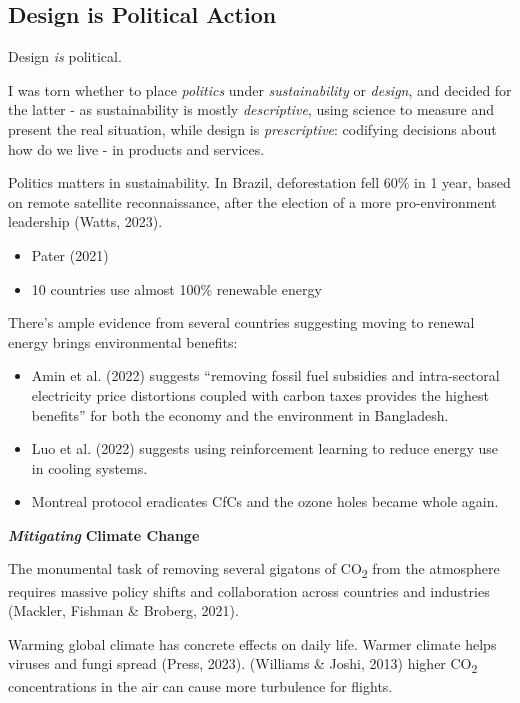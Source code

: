 \documentclass[
  letterpaper,
  DIV=11,
  numbers=noendperiod]{scrartcl}
\providecommand{\tightlist}{%
  \setlength{\itemsep}{0pt}\setlength{\parskip}{0pt}}\usepackage{longtable,booktabs,array}
\begin{document}
\subsection{Design is Political
Action}\label{design-is-political-action}

Design \emph{is} political.

I was torn whether to place \emph{politics} under \emph{sustainability}
or \emph{design}, and decided for the latter - as sustainability is
mostly \emph{descriptive}, using science to measure and present the real
situation, while design is \emph{prescriptive}: codifying decisions
about how do we live - in products and services.

Politics matters in sustainability. In Brazil, deforestation fell 60\%
in 1 year, based on remote satellite reconnaissance, after the election
of a more pro-environment leadership (Watts, 2023).

\begin{itemize}
\tightlist
\item
  Pater (2021)
\item
  10 countries use almost 100\% renewable energy
\end{itemize}

There's ample evidence from several countries suggesting moving to
renewal energy brings environmental benefits:

\begin{itemize}
\item
  Amin et al. (2022) suggests ``removing fossil fuel subsidies and
  intra-sectoral electricity price distortions coupled with carbon taxes
  provides the highest benefits'' for both the economy and the
  environment in Bangladesh.
\item
  Luo et al. (2022) suggests using reinforcement learning to reduce
  energy use in cooling systems.
\item
  Montreal protocol eradicates CfCs and the ozone holes became whole
  again.
\end{itemize}

\textbf{\emph{Mitigating}} \textbf{Climate Change}

The monumental task of removing several gigatons of CO\textsubscript{2}
from the atmosphere requires massive policy shifts and collaboration
across countries and industries (Mackler, Fishman \& Broberg, 2021).

Warming global climate has concrete effects on daily life. Warmer
climate helps viruses and fungi spread (Press, 2023). (Williams \&
Joshi, 2013) higher CO\textsubscript{2} concentrations in the air can
cause more turbulence for flights.
\end{document}
